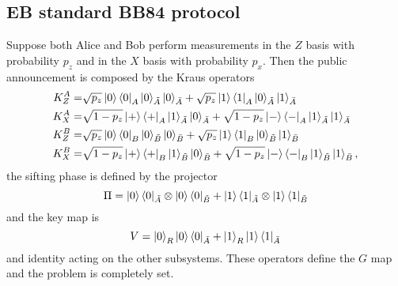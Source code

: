 \documentclass{article}
\begin{document}
    \subsection{EB standard BB84 protocol}
    Suppose both Alice and Bob perform measurements in the \(Z\) basis with probability \(p_z\) and in the \(X\) basis with probability \(p_x\).
    Then the public announcement is composed by the Kraus operators
    \begin{align*}
        K^A_Z =& \sqrt{p_z}\ket{0}\bra{0}_A\ket{0}_{\tilde{A}}\ket{0}_{\bar{A}}+\sqrt{p_z}\ket{1}\bra{1}_A\ket{0}_{\tilde{A}}\ket{1}_{\bar{A}}\\
        K^A_X =& \sqrt{1-p_z}\ket{+}\bra{+}_A\ket{1}_{\tilde{A}}\ket{0}_{\bar{A}}+\sqrt{1-p_z}\ket{-}\bra{-}_A\ket{1}_{\tilde{A}}\ket{1}_{\bar{A}}\\
        K^B_Z =& \sqrt{p_z}\ket{0}\bra{0}_B\ket{0}_{\tilde{B}}\ket{0}_{\bar{B}}+\sqrt{p_z}\ket{1}\bra{1}_B\ket{0}_{\tilde{B}}\ket{1}_{\bar{B}}\\
        K^B_X =& \sqrt{1-p_z}\ket{+}\bra{+}_B\ket{1}_{\tilde{B}}\ket{0}_{\bar{B}}+\sqrt{1-p_z}\ket{-}\bra{-}_B\ket{1}_{\tilde{B}}\ket{1}_{\bar{B}},
    \end{align*}
    the sifting phase is defined by the projector
    \[\Pi=\ket{0}\bra{0}_{\tilde{A}}\otimes\ket{0}\bra{0}_{\tilde{B}}+\ket{1}\bra{1}_{\tilde{A}}\otimes\ket{1}\bra{1}_{\tilde{B}}\]
    and the key map is 
    \[V=\ket{0}_R\ket{0}\bra{0}_{\bar{A}}+\ket{1}_R\ket{1}\bra{1}_{\bar{A}}\]
    and identity acting on the other subsystems.
    These operators define the \(G\) map and the problem is completely set.
\end{document}
